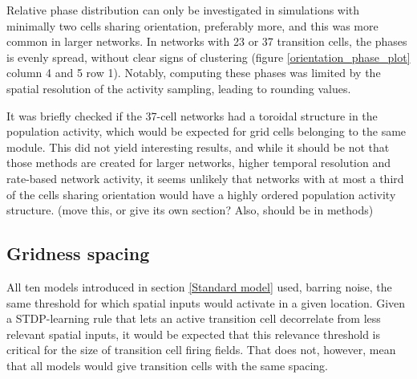 \documentclass{article}
\begin{document}
    Relative phase distribution can only be investigated in simulations with minimally two cells sharing orientation, preferably more, and this was more common in larger networks. In networks with 23 or 37 transition cells, the phases is evenly spread, without clear signs of clustering (figure \ref{orientation_phase_plot} column 4 and 5 row 1). Notably, computing these phases was limited by the spatial resolution of the activity sampling, leading to rounding values.
    
    It was briefly checked if the 37-cell networks had a toroidal structure in the population activity, which would be expected for grid cells belonging to the same module. This did not yield interesting results, and while it should be not that those methods are created for larger networks, higher temporal resolution and rate-based network activity, it seems unlikely that networks with at most a third of the cells sharing orientation would have a highly ordered population activity structure. (move this, or give its own section? Also, should be in methods)

    \subsection{Gridness spacing} \label{Spacing}

    All ten models introduced in section \ref{Standard model} used, barring noise, the same threshold for which spatial inputs would activate in a given location. Given a STDP-learning rule that lets an active transition cell decorrelate from less relevant spatial inputs, it would be expected that this relevance threshold is critical for the size of transition cell firing fields. That does not, however, mean that all models would give transition cells with the same spacing.
\end{document}
